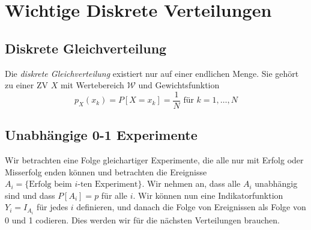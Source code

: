 \section{Wichtige Diskrete Verteilungen}

\subsection{Diskrete Gleichverteilung}
Die \textit{diskrete Gleichverteilung} existiert nur auf einer endlichen Menge. Sie gehört zu einer ZV $X$ mit Wertebereich $\mathcal{W}$ und Gewichtsfunktion 
$$p_X(x_k) = P[X=x_k]=\frac{1}{N} \mbox{   für } k=1,\dots, N$$

\subsection{Unabhängige 0-1 Experimente}
Wir betrachten eine Folge gleichartiger Experimente, die alle nur mit Erfolg oder Misserfolg enden können und betrachten die Ereignisse $A_i = \{\mbox{Erfolg beim }i\mbox{-ten Experiment}\}$. Wir nehmen an, dass alle $A_i$ unabhängig sind und dass $P[A_i]=p$ für alle $i$. Wir können nun eine Indikatorfunktion $Y_i = I_{A_i}$ für jedes $i$ definieren, und danach die Folge von Ereignissen als Folge von 0 und 1 codieren. Dies werden wir für die nächsten Verteilungen brauchen.